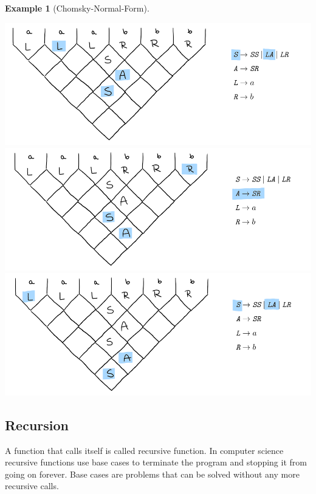 \documentclass[a4paper, 11pt]{article}
\newtheorem*{example*}{Example}
\begin{document}
\begin{example*}[Chomsky-Normal-Form]
\begin{center}
\includegraphics[scale=0.9]{images/3.png} \\
\includegraphics[scale=0.9]{images/2.png} \\
\includegraphics[scale=0.9]{images/1.png} \\
\end{center}

\end{example*}




\subsection{Recursion}
\label{recursion}

A function that calls itself is called recursive function. In computer science recursive functions use base cases to terminate the program and stopping it from going on forever. Base cases are problems that can be solved without any more recursive calls.
\cite{recursion}
\end{document}
